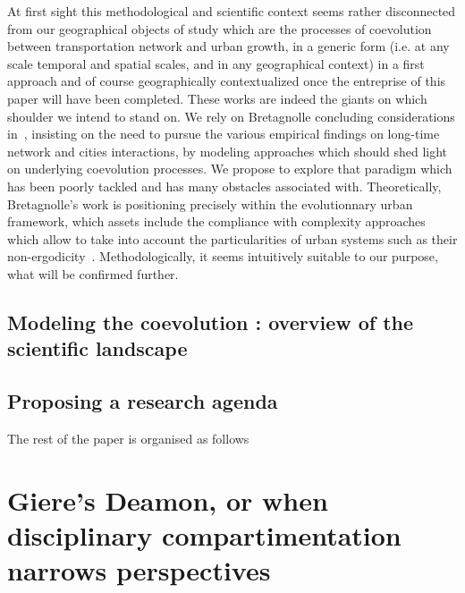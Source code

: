 At first sight this methodological and scientific context seems rather disconnected from our geographical objects of study which are the processes of coevolution between transportation network and urban growth, in a generic form (i.e. at any scale temporal and spatial scales, and in any geographical context) in a first approach and of course geographically contextualized once the entreprise of this paper will have been completed. These works are indeed the giants on which shoulder we intend to stand on. We rely on Bretagnolle concluding considerations in~\cite{bretagnolle:tel-00459720}, insisting on the need to pursue the various empirical findings on long-time network and cities interactions, by modeling approaches which should shed light on underlying coevolution processes. We propose to explore that paradigm which has been poorly tackled and has many obstacles associated with. Theoretically, Bretagnolle's work is positioning precisely within the evolutionnary urban framework, which assets include the compliance with complexity approaches which allow to take into account the particularities of urban systems such as their non-ergodicity~\cite{pumain2012urban}. Methodologically, it seems intuitively suitable to our purpose, what will be confirmed further.


\subsection{Modeling the coevolution : overview of the scientific landscape}



\subsection{Proposing a research agenda}





The rest of the paper is organised as follows




\section{Giere's Deamon, or when disciplinary compartimentation narrows perspectives}

